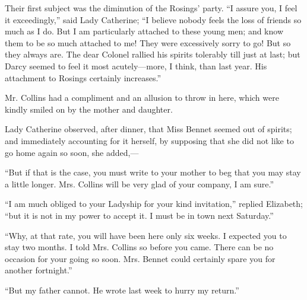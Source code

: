 \documentclass[10pt]{book}
\begin{document}
   Their first subject was the diminution of the Rosings’ party. “I assure
you, I feel it exceedingly,” said Lady Catherine; “I believe nobody
feels the loss of friends so much as I do. But I am particularly
attached to these young men; and know them to be so much attached to me!
They were excessively sorry to go! But so they always are. The dear
Colonel rallied his spirits tolerably till just at last; but Darcy
seemed to feel it most acutely—more, I think, than last year. His
attachment to Rosings certainly increases.”
  

   Mr. Collins had a compliment and an allusion to throw in here, which
were kindly smiled on by the mother and daughter.
  

   Lady Catherine observed, after dinner, that Miss Bennet seemed out of
spirits; and immediately accounting for it herself, by supposing that
she did not like to go home again so soon, she added,—
  

   “But if that is the case, you must write to your mother to beg that you
may stay a little longer. Mrs. Collins will be very glad of your
company, I am sure.”
  

   “I am much obliged to your Ladyship for your kind invitation,” replied
Elizabeth; “but it is not in my power to accept it. I must be in town
next Saturday.”
  

   “Why, at that rate, you will have been here only six weeks. I expected
you to stay two months. I told Mrs. Collins so before you came. There
can be no occasion for
   your going so soon. Mrs. Bennet could certainly
spare you for another fortnight.”
  

   “But my father cannot. He wrote last week to hurry my return.”
  
\end{document}
